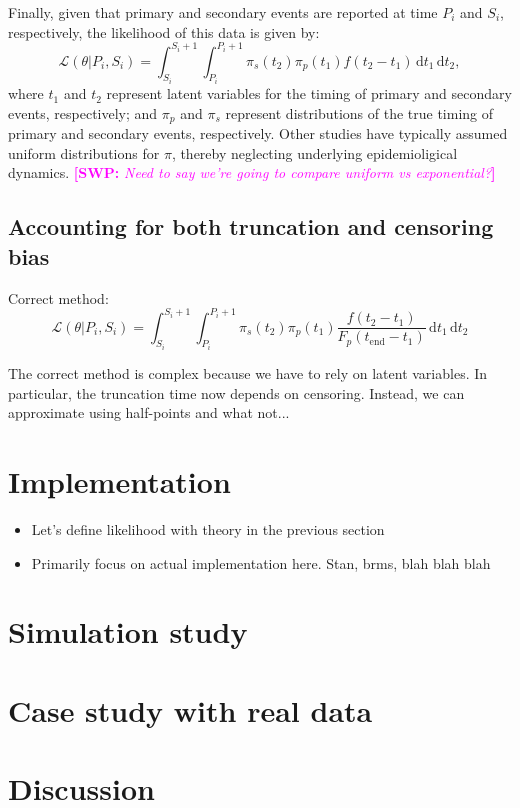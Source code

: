 \documentclass[12pt]{article}
\newcommand{\comment}{\showcomment}
\newcommand{\showcomment}[3]{\textcolor{#1}{\textbf{[#2: }\textsl{#3}\textbf{]}}}
\newcommand{\swp}[1]{\comment{magenta}{SWP}{#1}}
\newcommand{\dd}[1]{\ensuremath{\, \mathrm{d}#1}}
\newcommand{\tend}{{t_{\mathrm{end}}}}
\begin{document}
Finally, given that primary and secondary events are reported at time $P_i$ and $S_i$, respectively, the likelihood of this data is given by:
\begin{equation}
\mathcal L(\theta|P_i, S_i) = \int_{S_i}^{S_i+1} \int_{P_i}^{P_i+1} \pi_s(t_2) \pi_p(t_1) f(t_2-t_1) \dd t_1 \dd t_2,
\end{equation}
where $t_1$ and $t_2$ represent latent variables for the timing of primary and secondary events, respectively;
and $\pi_p$ and $\pi_s$ represent distributions of the true timing of primary and secondary events, respectively.
Other studies have typically assumed uniform distributions for $\pi$, thereby neglecting underlying epidemioligical dynamics.
\swp{Need to say we're going to compare uniform vs exponential?}

\subsection{Accounting for both truncation and censoring bias}

Correct method:
\begin{equation}
\mathcal L(\theta|P_i, S_i) = \int_{S_i}^{S_i+1} \int_{P_i}^{P_i+1} \pi_s(t_2) \pi_p(t_1) \frac{f(t_2 - t_1)}{F_p(\tend-t_1)} \dd t_1 \dd t_2
\end{equation}

The correct method is complex because we have to rely on latent variables. In particular, the truncation time now depends on censoring. Instead, we can approximate using half-points and what not...

\section{Implementation}

\begin{itemize}
  \item Let's define likelihood with theory in the previous section
  \item Primarily focus on actual implementation here. Stan, brms, blah blah blah
\end{itemize}

\section{Simulation study}

\section{Case study with real data}

\section{Discussion}

\pagebreak


\end{document}
